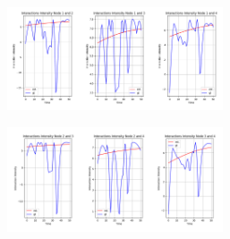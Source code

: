 \begin{figure}
    \begin{subfigure}[b]{\textwidth}
        \centering
        \includegraphics[width=0.7\textwidth]{0_images/rq1_2_1step_intensity_plot_appendix3.PNG}
    \end{subfigure}
    \vfill
    \begin{subfigure}[b]{\textwidth}
        \centering
        \includegraphics[width=0.7\textwidth]{0_images/rq1_2_1step_intensity_plot_appendix4.PNG}
    \end{subfigure}
\end{figure}